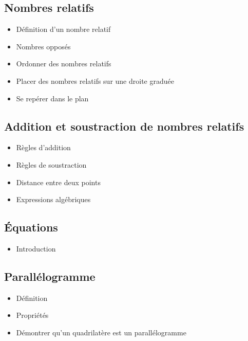 \subsection{Nombres relatifs}
\begin{itemize}
	\item Définition d'un nombre relatif
	\item Nombres opposés
	\item Ordonner des nombres relatifs
	\item Placer des nombres relatifs sur une droite graduée
	\item Se repérer dans le plan	
\end{itemize}

\subsection{Addition et soustraction de nombres relatifs}
\begin{itemize}
	\item Règles d'addition
	\item Règles de soustraction
	\item Distance entre deux points
	\item Expressions algébriques
\end{itemize}

\subsection{\'Equations}
\begin{itemize}
	\item Introduction
\end{itemize}

\subsection{Parallélogramme}
\begin{itemize}
	\item Définition
	\item Propriétés
	\item Démontrer qu'un quadrilatère est un parallélogramme
\end{itemize}

